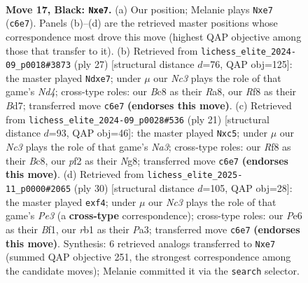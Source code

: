\documentclass[11pt]{article}
\begin{document}
\clearpage

\begin{figure}[p]\centering
\begin{subfigure}{0.46\textwidth}\centering
\resizebox{\linewidth}{!}{%
\newchessgame
\chessboard[
  setfen={r1b2rk1/pp2Qp1p/2n1pnp1/2P5/2P5/4P3/P1N1BPPP/1RB2RK1 b - - 0 17},
  showmover=false,
  pgfstyle=straightmove, color=movearrow, markmove={c6-e7}
]}
\caption{}
\end{subfigure}\hfill
\begin{subfigure}{0.46\textwidth}\centering
\resizebox{\linewidth}{!}{%
\newchessgame
\chessboard[
  setfen={r4rk1/pp1bQpp1/2n1p2p/3n4/2P5/P2B1N2/1P3PPP/R1B2RK1 b - - 0 14},
  showmover=false,
  pgfstyle=straightmove, color=movearrow, markmove={d5-e7}
]}
\caption{}
\end{subfigure}
\\[4pt]
\begin{subfigure}{0.46\textwidth}\centering
\resizebox{\linewidth}{!}{%
\newchessgame
\chessboard[
  setfen={r1b1k1n1/pp1ppp2/n5rp/2Q3p1/2P1P3/2N5/PP3PPP/1R2KBNR b Kq - 0 11},
  showmover=false,
  pgfstyle=straightmove, color=movearrow, markmove={a6-c5}
]}
\caption{}
\end{subfigure}\hfill
\begin{subfigure}{0.46\textwidth}\centering
\resizebox{\linewidth}{!}{%
\newchessgame
\chessboard[
  setfen={r1b3r1/pp2kp1p/2n1pp2/8/5q2/P1R1PNP1/1P3P1P/4KB1R w K - 0 16},
  showmover=false,
  pgfstyle=straightmove, color=movearrow, markmove={e3-f4}
]}
\caption{}
\end{subfigure}
\caption{\textbf{Move 17, Black: \texttt{Nxe7}.} (a) Our position; Melanie plays \texttt{Nxe7} (\texttt{c6e7}). Panels (b)--(d) are the retrieved master positions whose correspondence most drove this move (highest QAP objective among those that transfer to it). (b) Retrieved from \texttt{lichess\_elite\_2024-09\_p0018\#3873} (ply 27) [structural distance $d$=76, QAP obj=125]: the master played \texttt{Ndxe7}; under $\mu$ our \emph{Nc3} plays the role of that game's \emph{Nd4}; cross-type roles: our \emph{B}c8 as their \emph{R}a8, our \emph{R}f8 as their \emph{B}d7; transferred move \texttt{c6e7} \textbf{(endorses this move)}. (c) Retrieved from \texttt{lichess\_elite\_2024-09\_p0028\#536} (ply 21) [structural distance $d$=93, QAP obj=46]: the master played \texttt{Nxc5}; under $\mu$ our \emph{Nc3} plays the role of that game's \emph{Na3}; cross-type roles: our \emph{R}f8 as their \emph{B}c8, our \emph{p}f2 as their \emph{N}g8; transferred move \texttt{c6e7} \textbf{(endorses this move)}. (d) Retrieved from \texttt{lichess\_elite\_2025-11\_p0000\#2065} (ply 30) [structural distance $d$=105, QAP obj=28]: the master played \texttt{exf4}; under $\mu$ our \emph{Nc3} plays the role of that game's \emph{Pe3} (a \textbf{cross-type} correspondence); cross-type roles: our \emph{P}e6 as their \emph{B}f1, our \emph{r}b1 as their \emph{P}a3; transferred move \texttt{c6e7} \textbf{(endorses this move)}. Synthesis: 6 retrieved analogs transferred to \texttt{Nxe7} (summed QAP objective 251, the strongest correspondence among the candidate moves); Melanie committed it via the \texttt{search} selector.}
\label{fig:thought-m33}
\end{figure}
\end{document}
